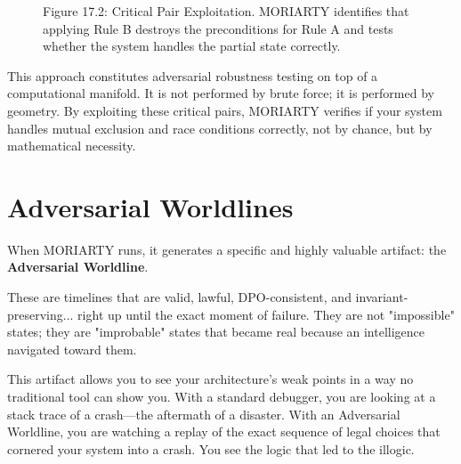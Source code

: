 \begin{figure}[h]
\centering
{}
\caption{Figure 17.2: Critical Pair Exploitation. MORIARTY identifies that applying Rule B destroys the preconditions for Rule A and tests whether the system handles the partial state correctly.}
\label{fig:critical-pair-exploitation}
\end{figure}

This approach constitutes adversarial robustness testing on top of a computational manifold. It is not performed by brute force; it is performed by geometry. By exploiting these critical pairs, MORIARTY verifies if your system handles mutual exclusion and race conditions correctly, not by chance, but by mathematical necessity.

\section{Adversarial Worldlines}

When MORIARTY runs, it generates a specific and highly valuable artifact: the \textbf{Adversarial Worldline}.

These are timelines that are valid, lawful, DPO-consistent, and invariant-preserving... right up until the exact moment of failure. They are not "impossible" states; they are "improbable" states that became real because an intelligence navigated toward them.

This artifact allows you to see your architecture's weak points in a way no traditional tool can show you. With a standard debugger, you are looking at a stack trace of a crash—the aftermath of a disaster. With an Adversarial Worldline, you are watching a replay of the exact sequence of legal choices that cornered your system into a crash. You see the logic that led to the illogic.

